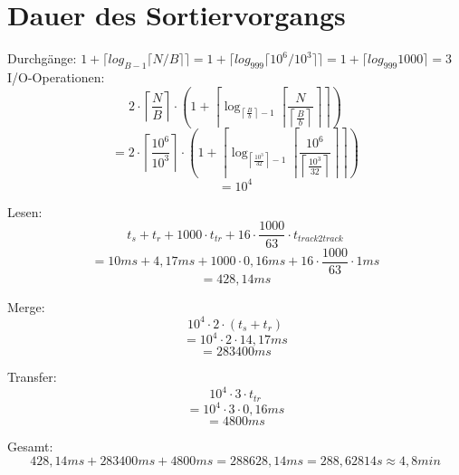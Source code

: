 \documentclass{scrartcl}
\begin{document}
\section{Dauer des Sortiervorgangs}
Durchgänge: $1+\lceil log_{B-1}\lceil N/B\rceil\rceil=1+\lceil log_{999}\lceil 10^6/10^3\rceil\rceil=1+\lceil log_{999} 1000 \rceil = 3$\\
I/O-Operationen: \[2 \cdot \left\lceil \frac{N}{B} \right\rceil \cdot \left(1+\left\lceil \log_{\left\lceil \frac{B}{b} \right\rceil - 1} \left\lceil \frac{N}{\left\lceil \frac{B}{b}\right\rceil}\right\rceil\right\rceil\right)\]
\[= 2 \cdot \left\lceil \frac{10^6}{10^3} \right\rceil \cdot \left(1+\left\lceil \log_{\left\lceil \frac{10^3}{32} \right\rceil - 1} \left\lceil \frac{10^6}{\left\lceil \frac{10^3}{32}\right\rceil}\right\rceil\right\rceil\right)\]
\[= 10^4\]

Lesen:
\[t_s + t_r + 1000 \cdot t_{tr} + 16 \cdot \frac{1000}{63} \cdot t_{track2track}\]
\[= 10ms + 4,17ms + 1000 \cdot 0,16ms + 16 \cdot \frac{1000}{63} \cdot 1ms\]
\[= 428,14ms\]

Merge:
\[10^4 \cdot 2 \cdot (t_s + t_r)\]
\[=10^4 \cdot 2 \cdot 14,17ms\]
\[=283400ms\]

Transfer:
\[10^4 \cdot 3 \cdot t_{tr}\]
\[=10^4 \cdot 3 \cdot 0,16ms\]
\[= 4800ms\]

Gesamt:
\[428,14ms + 283400ms + 4800ms = 288628,14ms = 288,62814s \approx 4,8min\]
\end{document}
